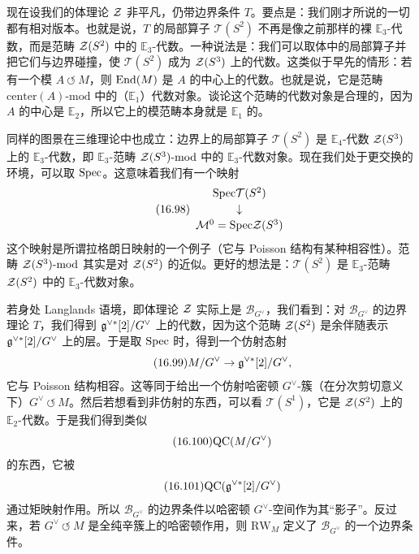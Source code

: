 现在设我们的体理论 $\mathcal{Z}$ 非平凡，仍带边界条件 $T$。要点是：我们刚才所说的一切都有相对版本。也就是说，$T$ 的局部算子 $\mathcal{T}(S^2)$ 不再是像之前那样的裸 $\mathbb{E}_3$-代数，而是范畴 $\mathcal{Z}(S^2)$ 中的 $\mathbb{E}_3$-代数。一种说法是：我们可以取体中的局部算子并把它们与边界碰撞，使 $\mathcal{T}(S^2)$ 成为 $\mathcal{Z}(S^3)$ 上的代数。这类似于早先的情形：若有一个模 $A\ \circlearrowleft\ M$，则 $\mathrm{End}(M)$ 是 $A$ 的中心上的代数。也就是说，它是范畴 $\mathrm{center}(A)\text{-}\mathrm{mod}$ 中的（$\mathbb{E}_1$）代数对象。谈论这个范畴的代数对象是合理的，因为 $A$ 的中心是 $\mathbb{E}_2$，所以它上的模范畴本身就是 $\mathbb{E}_1$ 的。

同样的图景在三维理论中也成立：边界上的局部算子 $\mathcal{T}(S^2)$ 是 $\mathbb{E}_4$-代数 $\mathcal{Z}(S^3)$ 上的 $\mathbb{E}_3$-代数，即 $\mathbb{E}_3$-范畴 $\mathcal{Z}(S^3)\text{-}\mathrm{mod}$ 中的 $\mathbb{E}_3$-代数对象。现在我们处于更交换的环境，可以取 $\mathrm{Spec}$。这意味着我们有一个映射
\begin{equation}\tag{16.98}
\begin{array}{c}
\mathrm{Spec}\mathcal{T}(S^2)\\[2pt]
\downarrow\\[2pt]
\mathcal{M}^0=\mathrm{Spec}\mathcal{Z}(S^3)
\end{array}
\end{equation}
这个映射是所谓拉格朗日映射的一个例子（它与 Poisson 结构有某种相容性）。范畴 $\mathcal{Z}(S^3)\text{-}\mathrm{mod}$ 其实是对 $\mathcal{Z}(S^2)$ 的近似。更好的想法是：$\mathcal{T}(S^2)$ 是 $\mathbb{E}_3$-范畴 $\mathcal{Z}(S^2)$ 中的 $\mathbb{E}_3$-代数对象。

若身处 Langlands 语境，即体理论 $\mathcal{Z}$ 实际上是 $\mathcal{B}_{G^\vee}$，我们看到：对 $\mathcal{B}_{G^\vee}$ 的边界理论 $T$，我们得到 $\mathfrak{g}^{\vee*}[2]/G^\vee$ 上的代数，因为这个范畴 $\mathcal{Z}(S^2)$ 是余伴随表示 $\mathfrak{g}^{\vee*}[2]/G^\vee$ 上的层。于是取 $\mathrm{Spec}$ 时，得到一个仿射态射
\begin{equation}\tag{16.99}
M/G^\vee\to\mathfrak{g}^{\vee*}[2]/G^\vee,
\end{equation}
它与 Poisson 结构相容。这等同于给出一个仿射哈密顿 $G^\vee$-簇（在分次剪切意义下）$G^\vee\ \circlearrowleft\ M$。然后若想看到非仿射的东西，可以看 $\mathcal{T}(S^1)$，它是 $\mathcal{Z}(S^2)$ 上的 $\mathbb{E}_2$-代数。于是我们得到类似
\begin{equation}\tag{16.100}
\mathrm{QC}(M/G^\vee)
\end{equation}
的东西，它被
\begin{equation}\tag{16.101}
\mathrm{QC}(\mathfrak{g}^{\vee*}[2]/G^\vee)
\end{equation}
通过矩映射作用。所以 $\mathcal{B}_{G^\vee}$ 的边界条件以哈密顿 $G^\vee$-空间作为其“影子”。反过来，若 $G^\vee\ \circlearrowleft\ M$ 是全纯辛簇上的哈密顿作用，则 $\mathrm{RW}_M$ 定义了 $\mathcal{B}_{G^\vee}$ 的一个边界条件。
